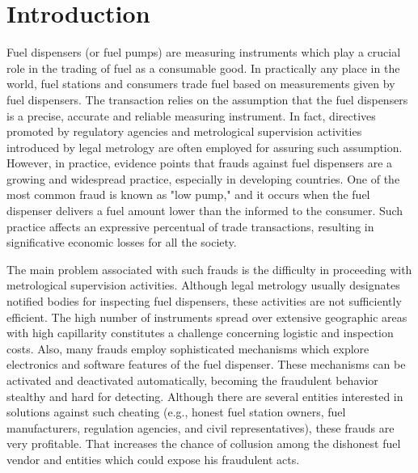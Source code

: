 \documentclass[sigplan]{acmart}
\begin{document}



\maketitle

\section{Introduction}

Fuel dispensers (or fuel pumps) are measuring instruments which play a crucial role in the trading of fuel as a consumable good.
In practically any place in the world, fuel stations and consumers trade fuel based on measurements given by fuel dispensers.
The transaction relies on the assumption that the fuel dispensers is a precise, accurate and reliable measuring instrument.
In fact, directives promoted by regulatory agencies and metrological supervision activities introduced by legal metrology are often employed for assuring such assumption.
However, in practice, evidence points that frauds against fuel dispensers are a growing and widespread practice, especially in developing countries.
One of the most common fraud is known as "low pump," and it occurs when the fuel dispenser delivers a fuel amount lower than the informed to the consumer.
Such practice affects an expressive percentual of trade transactions, resulting in significative economic losses for all the society.

The main problem associated with such frauds is the difficulty in proceeding with metrological supervision activities.
Although legal metrology usually designates notified bodies for inspecting fuel dispensers, these activities are not sufficiently efficient.
The high number of instruments spread over extensive geographic areas with high capillarity constitutes a challenge concerning logistic and inspection costs.
Also, many frauds employ sophisticated mechanisms which explore electronics and software features of the fuel dispenser.
These mechanisms can be activated and deactivated automatically, becoming the fraudulent behavior stealthy and hard for detecting.
Although there are several entities interested in solutions against such cheating (e.g., honest fuel station owners, fuel manufacturers, regulation agencies, and civil representatives), these frauds are very profitable.
That increases the chance of collusion among the dishonest fuel vendor and entities which could expose his fraudulent acts.
\end{document}
